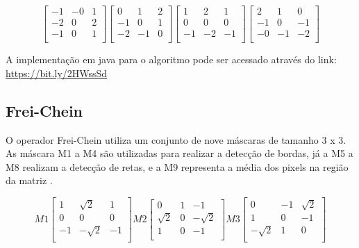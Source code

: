 \documentclass[
	12pt,				%
	oneside,			%
	a4paper,			%
	english,			%
	french,				%
	spanish,			%
	brazil,				%
	]{abntex2}
\begin{document}
\[
\begin{bmatrix}
    -1 & -0 &  1   \\ 
	-2 &  0 &  2   \\ 
	-1 &  0 &  1   \\ 
\end{bmatrix} 
\begin{bmatrix}
     0 &  1 &  2   \\ 
	-1 &  0 &  1   \\ 
	-2 & -1 &  0   \\ 
\end{bmatrix}
\begin{bmatrix}
     1 &  2 &  1   \\ 
	 0 &  0 &  0   \\ 
	-1 & -2 & -1   \\ 
\end{bmatrix} 
\begin{bmatrix}
     2 &  1 &  0   \\ 
	-1 &  0 & -1   \\ 
	-0 & -1 & -2   \\ 
\end{bmatrix}
\]

A implementação em java para o algoritmo pode ser acessado através do link: \url{https://bit.ly/2HWssSd}

\subsection{Frei-Chein}
O operador Frei-Chein utiliza um conjunto de nove máscaras de tamanho 3 x 3. As máscara M1 a M4 são utilizadas para realizar a detecção de bordas, já a M5 a M8 realizam a detecção de retas, e a M9 representa a média dos pixels na região da matriz \cite{pedriniSchwartz:2008}. 

\[
M1
\begin{bmatrix}
     	 	 	 1 &  \sqrt{2} &  1         \\ 
	             0 &         0 &  0         \\ 
	            -1 & -\sqrt{2} & -1         \\ 
\end{bmatrix} 
M2
\begin{bmatrix}
     	     0 &             1 & -1         \\ 
	  \sqrt{2} &             0 & -\sqrt{2}  \\ 
	         1 &             0 & -1         \\ 
\end{bmatrix}
M3
\begin{bmatrix}
     	 	 0 &            -1 & \sqrt{2}   \\ 
	         1 &             0 & -1         \\ 
	 -\sqrt{2} &             1 &  0         \\ 
\end{bmatrix} 
\]
\end{document}
